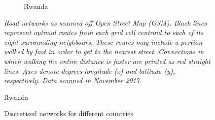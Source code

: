 \documentclass[11pt, oneside]{article}   	%
\newcommand{\mysubcaption}[1]{
\justify
\begin{spacing}{0.7}
\textit{\footnotesize #1}
\end{spacing}}
\begin{document}
\begin{figure}[p]
\begin{subfigure}[c]{0.43\textwidth}
\caption{Rwanda}
\label{fig:Rwanda_roads}
\end{subfigure}
\mysubcaption{Road networks as scanned off Open Street Map (OSM). Black lines represent optimal routes from each grid cell centroid to each of its eight surrounding neighbours. These routes may include a portion walked by foot in order to get to the nearest street. Connections in which walking the entire distance is faster are printed as red straight lines. Axes denote degrees longitude (x) and latitude (y), respectively. Data scanned in November 2017.}

\label{fig:roads}
\end{figure}

\begin{figure}[p]
\centering
\caption{Discretised networks for different countries}


\end{figure}
\end{document}
